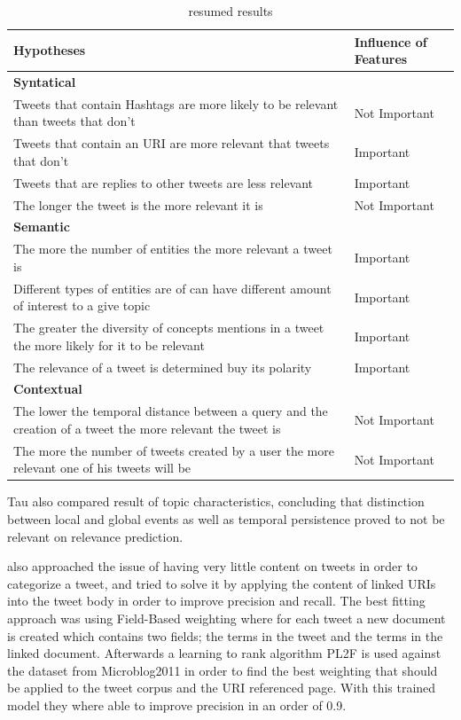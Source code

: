 \begin{table}[tb]
  \caption{\citet{Tao2012} resumed results}
  \label{tab:tao_table}
  \begin{tabularx}{\textwidth}{|X|l|}
  \hline
  \textbf{Hypotheses} & \textbf{Influence of Features} \\
  \hline
  \hline

  {\bf Syntatical} &  \\
  \hline
  Tweets that contain Hashtags are more likely to be relevant than tweets that don't & Not Important \\
  \hline
  Tweets that contain an URI are more relevant that tweets that don't  &Important \\
  \hline
  Tweets that are replies to other tweets are less relevant & Important \\
  \hline
  The longer the tweet is the more relevant it is & Not Important\\
  \hline
  \hline

  {\bf Semantic}  &  \\
  \hline
  
  The more the number of entities the more relevant a tweet is  & Important \\
  \hline
  Different types of entities are of can have different amount of interest to a give topic  & Important \\
  \hline
  The greater the diversity of concepts mentions in a tweet the more likely for it to be relevant & Important \\
  \hline
  The relevance of a tweet is determined buy its polarity & Important \\
  \hline
  \hline

  {\bf Contextual} &  \\
  \hline
  The lower the temporal distance between a query and the creation of a tweet the more relevant the tweet is  & Not Important \\
  \hline
  The more the number of tweets created by a user the more relevant one of his tweets will be & Not Important \\
  \hline
  \end{tabularx}
\end{table}

Tau also compared result of topic characteristics, concluding that distinction between local and global events as well as temporal persistence proved to not be relevant on relevance prediction.

\citet{McCreadie2013} also approached the issue of having very little content on tweets in order to categorize a tweet, and tried to solve it by applying the content of linked URIs into the tweet body in order to improve precision and recall. The best fitting approach was using Field-Based weighting where for each tweet a new document is created which contains two fields; the terms in the tweet and the terms in the linked document. 
Afterwards a learning to rank algorithm PL2F is used against the dataset from Microblog2011 in order to find the best weighting that should be applied to the tweet corpus and the URI referenced page. 
With this trained model they where able to improve precision in an order of 0.9. 

